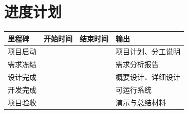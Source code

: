 \section{进度计划}

\begin{longtable}{|p{34mm}|p{38mm}|p{38mm}|p{40mm}|}
\hline
\textbf{里程碑} & \textbf{开始时间} & \textbf{结束时间} & \textbf{输出} \\
\hline
项目启动 &  &  & 项目计划、分工说明 \\
\hline
需求冻结 &  &  & 需求分析报告 \\
\hline
设计完成 &  &  & 概要设计、详细设计 \\
\hline
开发完成 &  &  & 可运行系统 \\
\hline
项目验收 &  &  & 演示与总结材料 \\
\hline
\end{longtable}
